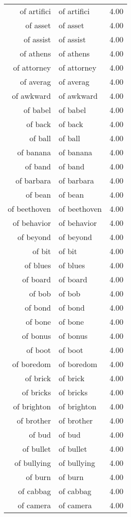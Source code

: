 \begin{table}[ht]
\begin{tabular}{rlr}
  of artifici & of artifici & 4.00 \\ 
  of asset & of asset & 4.00 \\ 
  of assist & of assist & 4.00 \\ 
  of athens & of athens & 4.00 \\ 
  of attorney & of attorney & 4.00 \\ 
  of averag & of averag & 4.00 \\ 
  of awkward & of awkward & 4.00 \\ 
  of babel & of babel & 4.00 \\ 
  of back & of back & 4.00 \\ 
  of ball & of ball & 4.00 \\ 
  of banana & of banana & 4.00 \\ 
  of band & of band & 4.00 \\ 
  of barbara & of barbara & 4.00 \\ 
  of bean & of bean & 4.00 \\ 
  of beethoven & of beethoven & 4.00 \\ 
  of behavior & of behavior & 4.00 \\ 
  of beyond & of beyond & 4.00 \\ 
  of bit & of bit & 4.00 \\ 
  of blues & of blues & 4.00 \\ 
  of board & of board & 4.00 \\ 
  of bob & of bob & 4.00 \\ 
  of bond & of bond & 4.00 \\ 
  of bone & of bone & 4.00 \\ 
  of bonus & of bonus & 4.00 \\ 
  of boot & of boot & 4.00 \\ 
  of boredom & of boredom & 4.00 \\ 
  of brick & of brick & 4.00 \\ 
  of bricks & of bricks & 4.00 \\ 
  of brighton & of brighton & 4.00 \\ 
  of brother & of brother & 4.00 \\ 
  of bud & of bud & 4.00 \\ 
  of bullet & of bullet & 4.00 \\ 
  of bullying & of bullying & 4.00 \\ 
  of burn & of burn & 4.00 \\ 
  of cabbag & of cabbag & 4.00 \\ 
  of camera & of camera & 4.00 \\ 

\end{tabular}
\end{table}
